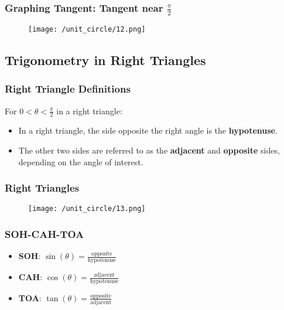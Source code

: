\begin{frame}
    \frametitle{Graphing Tangent: Tangent near \(\frac{\pi}{2}\)}
    \begin{figure}
        \centering
        \texttt{[image: /unit\_circle/12.png]}
    \end{figure}
\end{frame}

\subsection{Trigonometry in Right Triangles}
\begin{frame}
    \frametitle{Right Triangle Definitions}
    For \(0<\theta<\frac{\pi}{2}\) in a right triangle:
    \begin{itemize}
        \item In a right triangle, the side opposite the right angle is the \textbf{hypotenuse}.
        \item The other two sides are referred to as the \textbf{adjacent} and \textbf{opposite} sides, depending on the angle of interest.
    \end{itemize}
\end{frame}
\begin{frame}
    \frametitle{Right Triangles}
    \begin{figure}
        \centering
        \texttt{[image: /unit\_circle/13.png]}
    \end{figure}
\end{frame}

\begin{frame}
    \frametitle{SOH-CAH-TOA}
    \begin{itemize}
        \item \textbf{SOH}: \(\sin(\theta) = \frac{\text{opposite}}{\text{hypotenuse}}\)
        \item \textbf{CAH}: \(\cos(\theta) = \frac{\text{adjacent}}{\text{hypotenuse}}\)
        \item \textbf{TOA}: \(\tan(\theta) = \frac{\text{opposite}}{\text{adjacent}}\)
    \end{itemize}
\end{frame}

